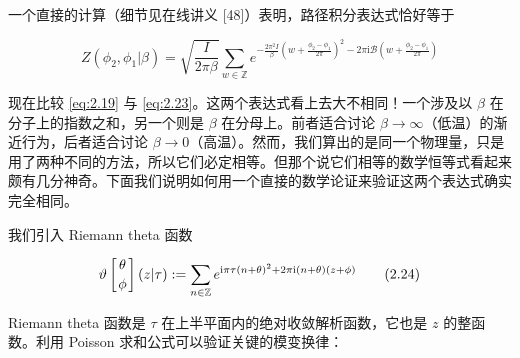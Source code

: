 
一个直接的计算（细节见在线讲义 [48]）表明，路径积分表达式恰好等于

\begin{equation}
  Z(\phi_2,\phi_1|\beta)=\sqrt{\frac{I}{2\pi\beta}}\sum_{w\in\mathbb{Z}}e^{-\frac{2\pi^{2}I}{\beta}\left(w+\frac{\phi_2-\phi_1}{2\pi}\right)^{2}-2\pi\mathrm{i}\mathcal{B}\left(w+\frac{\phi_2-\phi_1}{2\pi}\right)}
  \tag{2.23}
  \label{eq:2.23}
\end{equation}


现在比较 \eqref{eq:2.19} 与 \eqref{eq:2.23}。这两个表达式看上去大不相同！一个涉及以 $\beta$ 在分子上的指数之和，另一个则是 $\beta$ 在分母上。前者适合讨论 $\beta\to\infty$（低温）的渐近行为，后者适合讨论 $\beta\to0$（高温）。然而，我们算出的是同一个物理量，只是用了两种不同的方法，所以它们必定相等。但那个说它们相等的数学恒等式看起来颇有几分神奇。下面我们说明如何用一个直接的数学论证来验证这两个表达式确实完全相同。

我们引入 Riemann theta 函数

\begin{equation}
  \vartheta\left[\genfrac{}{}{0pt}{}{\theta}{\phi}\right](z|\tau):=\sum_{n\in\mathbb{Z}}e^{\mathrm{i}\pi\tau(n+\theta)^{2}+2\pi\mathrm{i}(n+\theta)(z+\phi)}
  \tag{2.24}
  \label{eq:2.24}
\end{equation}

Riemann theta 函数是 $\tau$ 在上半平面内的绝对收敛解析函数，它也是 $z$ 的整函数。利用 Poisson 求和公式可以验证关键的模变换律：


